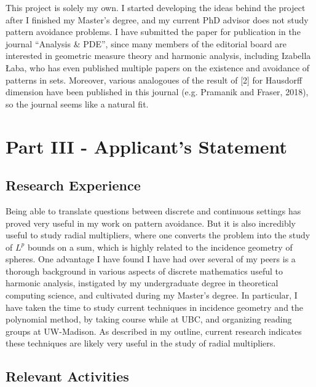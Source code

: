 \documentclass[12pt]{article}
\theoremstyle{plain}
\theoremstyle{remark}
\theoremstyle{definition}
\begin{document}
This project is solely my own. I started developing the ideas behind the project after I finished my Master's degree, and my current PhD advisor does not study pattern avoidance problems. I have submitted the paper for publication in the journal ``Analysis \& PDE'', since many members of the editorial board are interested in geometric measure theory and harmonic analysis, including Izabella Łaba, who has even published multiple papers on the existence and avoidance of patterns in sets. Moreover, various analogoues of the result of [2] for Hausdorff dimension have been published in this journal (e.g. Pramanik and Fraser, 2018), so the journal seems like a natural fit.

\section*{Part III - Applicant's Statement}

\subsection*{Research Experience}

Being able to translate questions between discrete and continuous settings has proved very useful in my work on pattern avoidance. But it is also incredibly useful to study radial multipliers, where one converts the problem into the study of $L^p$ bounds on a sum, which is highly related to the incidence geometry of spheres. One advantage I have found I have had over several of my peers is a thorough background in various aspects of discrete mathematics useful to harmonic analysis, instigated by my undergraduate degree in theoretical computing science, and cultivated during my Master's degree. In particular, I have taken the time to study current techniques in incidence geometry and the polynomial method, by taking course while at UBC, and organizing reading groups at UW-Madison. As described in my outline, current research indicates these techniques are likely very useful in the study of radial multipliers. 

\subsection*{Relevant Activities}
\end{document}
